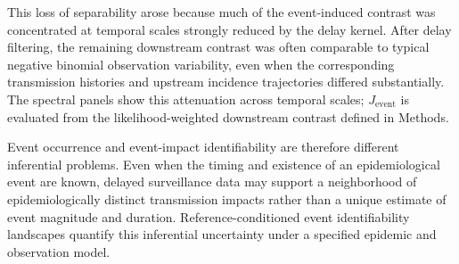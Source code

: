 This loss of separability arose because much of the event-induced contrast was concentrated at temporal scales strongly reduced by the delay kernel. After delay filtering, the remaining downstream contrast was often comparable to typical negative binomial observation variability, even when the corresponding transmission histories and upstream incidence trajectories differed substantially. The spectral panels show this attenuation across temporal scales; \(J_{\mathrm{event}}\) is evaluated from the likelihood-weighted downstream contrast defined in Methods.

Event occurrence and event-impact identifiability are therefore different inferential problems. Even when the timing and existence of an epidemiological event are known, delayed surveillance data may support a neighborhood of epidemiologically distinct transmission impacts rather than a unique estimate of event magnitude and duration. Reference-conditioned event identifiability landscapes quantify this inferential uncertainty under a specified epidemic and observation model.
